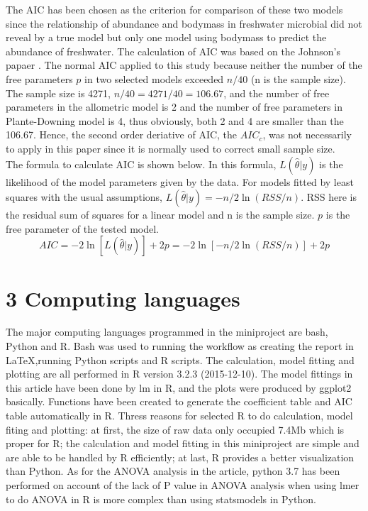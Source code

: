 \documentclass[11pt]{article}
\begin{document}
\begin{linenumbers}
The AIC has been chosen as the criterion for comparison of these two models since the relationship of abundance and bodymass in freshwater microbial did not reveal by a true model but only one model using bodymass to predict the abundance of freshwater.
The calculation of AIC was based on the Johnson's papaer \cite{johnson2004model}.
The normal AIC applied to this study because neither the number of the free parameters $p$ in two selected models exceeded $n/40$ (n is the sample size). The sample size is 4271,  $n/40 =4271/40 = 106.67 $, and the number of free parameters in the allometric model is 2 and the number of free parameters in Plante-Downing model is 4, thus obviously, both 2 and 4 are smaller than the 106.67. Hence, the second order deriative of AIC, the $\mathit{AIC}_{c}$, was not necessarily to apply in this paper since it is normally used to correct small sample size. \\
The formula to calculate AIC is shown below. In this formula, $L(\hat{\theta}|y)$ is the likelihood of the model parameters given by the data. For models fitted by least squares with the usual assumptions,
$L(\hat{\theta}|y)=-n/2\ln(RSS/n)$. RSS here is the residual sum of squares for a linear model and n is the sample size. $p$ is the free parameter of the tested model.
\begin{equation}
AIC = -2 \ln [ L (\hat{\theta}|y)] + 2 p = -2 \ln [-n/2\ln(RSS/n)] + 2 p
\end{equation}

\section*{3 Computing languages}
The major computing languages programmed in the miniproject are bash, Python and R. Bash was used to running the workflow as creating the report in LaTeX,running Python scripts and R scripts. The calculation, model fitting and plotting are all performed in R version 3.2.3 (2015-12-10). The model fittings in this article have been done by lm in R, and the plots were produced by ggplot2 basically. Functions have been created to generate the coefficient table and AIC table automatically in R. Thress reasons for selected R to do calculation, model fiting and plotting: at first, the size of raw data only occupied 7.4Mb which is proper for R; the calculation and model fitting in this miniproject are simple and are able to be handled by R efficiently; at last, R provides a better visualization than Python.
As for the ANOVA analysis in the article, python 3.7 has been performed on account of the lack of P value in ANOVA analysis when using lmer to do ANOVA in R is more complex than using statsmodels in Python. \\


\end{linenumbers}
\end{document}
